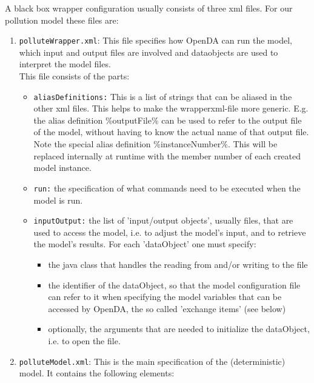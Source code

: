 A black box wrapper configuration usually consists of three xml files. For our
pollution model these files are:
\begin{enumerate}
   \item {\tt polluteWrapper.xml}: This file specifies how OpenDA can run the model, which input and output files are involved and dataobjects are used to interpret the model files.
     \\ This file
     consists of the parts:
     \begin{itemize}
        \item {\tt aliasDefinitions:} This is a list of strings that can be
          aliased in the other xml files. This helps to make the
          wrapperxml-file more generic. E.g. the alias definition
          \%outputFile\% can be used to refer to the output file of the model,
          without having to know the actual name of that output file.\\ Note
          the special alias definition \%instanceNumber\%. This will be
          replaced internally at runtime with the member number of each created
          model instance.
        \item {\tt run:} the specification of what commands need to be executed
          when the model is run.
        \item {\tt inputOutput:} the list of 'input/output objects', usually
          files, that are used to access the model, i.e. to adjust the model's
          input, and to retrieve the model's results. For each 'dataObject' one
          must specify:
        \begin{itemize}
           \item the java class that handles the reading from and/or writing to
             the file
           \item the identifier of the dataObject, so that the model
             configuration file can refer to it when specifying the model
             variables that can be accessed by OpenDA, the so called 'exchange
             items' (see below)
           \item optionally, the arguments that are needed to initialize the
             dataObject, i.e. to open the file.
        \end{itemize}
     \end{itemize}
   \item {\tt polluteModel.xml}: This is the main specification of the
     (deterministic) model. It contains the following elements:
     \begin{itemize}

\end{itemize}
\end{enumerate}
